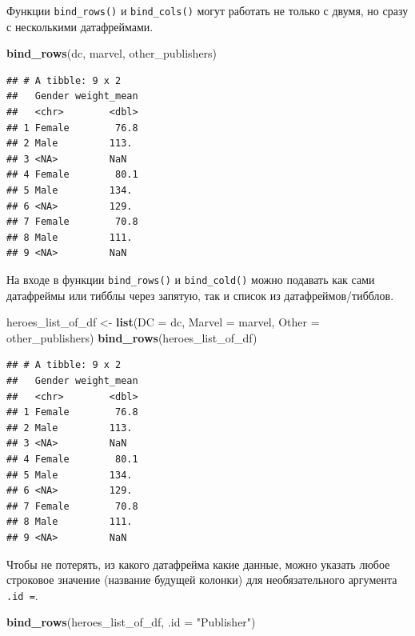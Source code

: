 \documentclass[
]{book}
\newenvironment{Shaded}{\begin{snugshade}}{\end{snugshade}}
\newcommand{\DataTypeTok}[1]{\textcolor[rgb]{0.13,0.29,0.53}{#1}}
\newcommand{\KeywordTok}[1]{\textcolor[rgb]{0.13,0.29,0.53}{\textbf{#1}}}
\newcommand{\NormalTok}[1]{#1}
\newcommand{\StringTok}[1]{\textcolor[rgb]{0.31,0.60,0.02}{#1}}
\begin{document}
Функции \texttt{bind\_rows()} и \texttt{bind\_cols()} могут работать не только с двумя, но сразу с несколькими датафреймами.

\begin{Shaded}
\begin{Highlighting}[]
\KeywordTok{bind_rows}\NormalTok{(dc, marvel, other_publishers)}
\end{Highlighting}
\end{Shaded}

\begin{verbatim}
## # A tibble: 9 x 2
##   Gender weight_mean
##   <chr>        <dbl>
## 1 Female        76.8
## 2 Male         113. 
## 3 <NA>         NaN  
## 4 Female        80.1
## 5 Male         134. 
## 6 <NA>         129. 
## 7 Female        70.8
## 8 Male         111. 
## 9 <NA>         NaN
\end{verbatim}

На входе в функции \texttt{bind\_rows()} и \texttt{bind\_cold()} можно подавать как сами датафреймы или тибблы через запятую, так и список из датафреймов/тибблов.

\begin{Shaded}
\begin{Highlighting}[]
\NormalTok{heroes_list_of_df <-}\StringTok{ }\KeywordTok{list}\NormalTok{(}\DataTypeTok{DC =}\NormalTok{ dc, }
                          \DataTypeTok{Marvel =}\NormalTok{ marvel, }
                          \DataTypeTok{Other =}\NormalTok{ other_publishers)}
\KeywordTok{bind_rows}\NormalTok{(heroes_list_of_df)}
\end{Highlighting}
\end{Shaded}

\begin{verbatim}
## # A tibble: 9 x 2
##   Gender weight_mean
##   <chr>        <dbl>
## 1 Female        76.8
## 2 Male         113. 
## 3 <NA>         NaN  
## 4 Female        80.1
## 5 Male         134. 
## 6 <NA>         129. 
## 7 Female        70.8
## 8 Male         111. 
## 9 <NA>         NaN
\end{verbatim}

Чтобы не потерять, из какого датафрейма какие данные, можно указать любое строковое значение (название будущей колонки) для необязательного аргумента \texttt{.id\ =}.

\begin{Shaded}
\begin{Highlighting}[]
\KeywordTok{bind_rows}\NormalTok{(heroes_list_of_df, }\DataTypeTok{.id =} \StringTok{"Publisher"}\NormalTok{)}
\end{Highlighting}
\end{Shaded}
\end{document}
